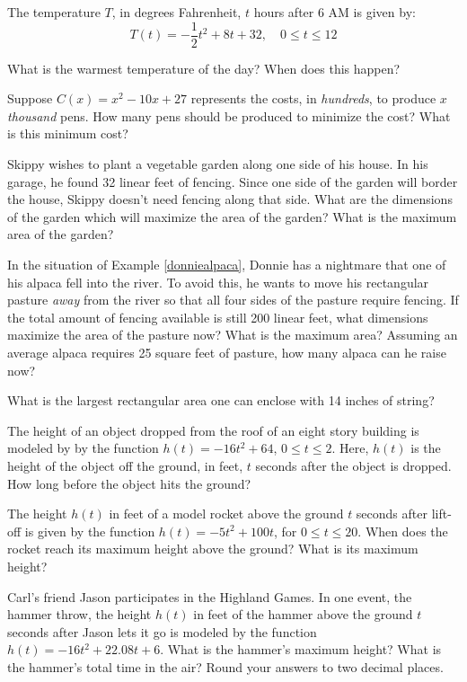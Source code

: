 \begin{exenum}
\item  The temperature $T$, in degrees Fahrenheit, $t$ hours after 6 AM is given by: \[ T(t) = -\frac{1}{2} t^2 + 8t+32, \quad 0 \leq t \leq 12\]

What is the warmest temperature of the day?  When does this happen?

\item  Suppose $C(x) = x^2-10x+27$ represents the costs, in \textit{hundreds}, to produce $x$ \textit{thousand} pens.  How many pens should be produced to minimize the cost?  What is this minimum cost?

\item \label{fixedperimetermaxareagarden} Skippy wishes to plant a vegetable garden along one side of his house.  In his garage, he found 32 linear feet of fencing.  Since one side of the garden will border the house, Skippy doesn't need fencing along that side.  What are the dimensions of the garden which will maximize the area of the garden?  What is the maximum  area of the garden?

\item In the situation of Example \ref{donniealpaca}, Donnie has a nightmare that one of his alpaca fell into the river.  To avoid this, he wants to move his rectangular pasture \textit{away} from the river so that all four sides of the pasture require fencing.  If the total amount of fencing available is still 200 linear feet, what dimensions maximize the area of the pasture now?  What is the maximum area?  Assuming an average alpaca requires 25 square feet of pasture, how many alpaca can he raise now?

\item What is the largest rectangular area one can enclose with 14 inches of string?

\item  The height of an object dropped from the roof of an eight story building is modeled by  by the function $h(t) = -16t^2 + 64$, $0 \leq t \leq 2$. Here,  $h(t)$ is the height of the object off the ground, in feet, $t$ seconds after the object is dropped.  How long before the object hits the ground?

\item  The height $h(t)$ in feet of a model rocket above the ground $t$ seconds after lift-off is given by the function $h(t) = -5t^2+100t$, for $0 \leq t \leq 20$.  When does the rocket reach its maximum height above the ground?  What is its maximum height?

\item  Carl's friend Jason participates in the Highland Games. In one event, the hammer throw, the height $h(t)$ in feet of the hammer above the ground $t$ seconds after Jason lets it go is modeled by the function $h(t) = -16t^2 +  22.08t + 6$.  What is the hammer's maximum height?  What is the hammer's total time in the air? Round your answers to two decimal places.


\end{exenum}
